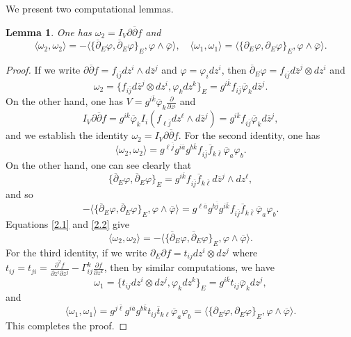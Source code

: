 \documentclass[12pt, reqno]{amsart}
\newcommand\bp{{\bar\partial}}
\theoremstyle{plain}
\newtheorem{lemma}[thm]{Lemma}
\theoremstyle{definition}
\newcommand{\bproof}{\begin{proof}}
\newcommand{\eproof}{\end{proof}}
\newcommand{\elemma}{\end{lemma}}
\newcommand{\blemma}{\begin{lemma}}
\newcommand{\p}{\partial}
\renewcommand{\bar}{\overline}
\renewcommand{\phi}{\varphi}
\newcommand{\beq}{\begin{equation}}
\newcommand{\eeq}{\end{equation}}
\renewcommand{\bp}{\bar{\partial}}
\newcommand{\ts}{\otimes}
\renewcommand{\>}{\rightarrow}
\renewcommand{\#}{\sharp}
\numberwithin{equation}{section} %
\begin{document}
\noindent We present two computational lemmas.

\blemma
\label{omegatwo} One has  $\omega_2 = I_V \p\bar\p f$ and
\beq \label{omegatwoA} \langle \omega_2, \omega_2 \rangle = - \langle \{\bar\p_E\phi,\bar\p_E\phi\}_E, \phi\wedge\bar\phi\rangle,
 \quad \langle \omega_1, \omega_1 \rangle =  \langle \{\p_E\phi,\p_E\phi\}_E, \phi\wedge\bar\phi\rangle. \eeq
\elemma

\bproof If we write  $ \p\bar\p f = f_{i\bar j}dz^i \wedge d\bar z{}^j $ and $\phi=\phi_i dz^i$, then $\bp_E \phi=f_{i\bar j} d\bar z^j\ts dz^i$ and
\beq \omega_2 = \{f_{i\bar j}d\bar z^j\ts dz^i, \phi_k dz^k \}_E = g^{i\bar k}f_{i\bar j}\bar \phi_k d\bar z{}^j. \eeq
On the other hand,  one has $V=g^{i\bar k}\bar \phi_k\frac{\p}{\p z^i}$ and
\beq I_V \p\bar\p f = g^{i\bar k}\bar \phi_k I_i(f_{\ell\bar j}dz^\ell\wedge d\bar z{}^j) = g^{i\bar k}f_{i\bar j}\bar \phi_k d\bar z{}^j, \eeq
and we establish the  identity $\omega_2 = I_V \p\bar\p f$. For the second identity, one has
\beq \langle \omega_2, \omega_2 \rangle = g^{\ell\bar j}g^{i\bar a}g^{b\bar k}f_{i\bar j}\bar f_{k\bar\ell}\bar \phi_a \phi_b. \label{2.1}\eeq
On the other hand,  one can see clearly that \beq  \{ \bar\p_E \phi,\bar\p_E \phi \}_E = g^{i\bar k}f_{i\bar j}\bar f_{k\bar\ell} d\bar z{}^j \wedge dz^\ell,\eeq
and so
\beq - \langle \{\bar\p_E\phi,\bar\p_E\phi\}_E, \phi\wedge\bar\phi\rangle = g^{\ell\bar a}g^{b\bar j}g^{i\bar k}f_{i\bar j}\bar f_{k\bar\ell}\bar\phi_a\phi_b. \label{2.2}\eeq
Equations \eqref{2.1} and \eqref{2.2} give
\beq \langle \omega_2, \omega_2 \rangle = - \langle \{\bar\p_E\phi,\bar\p_E\phi\}_E, \phi\wedge\bar\phi\rangle.\eeq
For the third identity, if we write $ \p_E \p f = t_{ij}dz^i \otimes dz^j $  where $ t_{ij} = t_{ji} = \frac{\p^2 f}{\p z^i\p z^j}- \Gamma_{ij}^k\frac{\p f}{\p z^k} $,
then by similar computations, we have
\beq \omega_1 = \{t_{ij}dz^i \otimes dz^j, \phi_k dz^k \}_E = g^{i\bar k}t_{ij}\bar \phi_k dz^j, \eeq
and
\beq \langle \omega_1, \omega_1 \rangle = g^{j\bar\ell}g^{i\bar a}g^{b\bar k}t_{ij}\bar t_{k\ell}\bar \phi_a \phi_b=
\langle \{\p_E\phi,\p_E\phi\}_E, \phi\wedge\bar\phi\rangle. \eeq
This completes the proof.\eproof
\end{document}
